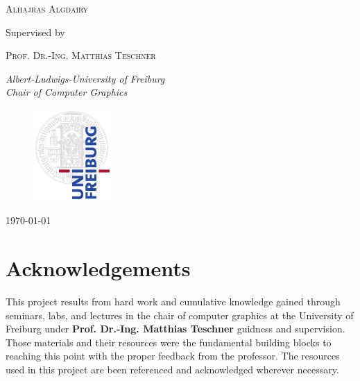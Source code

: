 \documentclass[11pt,a4paper]{article}
\begin{document}
\begin{titlepage}
	{\scshape\Large Alhajras Algdairy \\} %
	
			\vspace{0.5\baselineskip} %

	Supervised by
	
	\vspace{0.5\baselineskip} %
	
	{\scshape\Large Prof. Dr.-Ing. Matthias Teschner\\} %

	\vspace{0.5\baselineskip} %
		
	\textit{Albert-Ludwigs-University of Freiburg \\ Chair of Computer Graphics} %
	
		
\begin{figure}[h]	
     \centering
         \includegraphics[width=3cm]{images/freiburg.png}
\end{figure}
	\vfill %
	
	


	
	\vspace{0.3\baselineskip} %
	
	\today%
	

\end{titlepage}

\clearpage

\section*{Acknowledgements}
This project results from hard work and cumulative knowledge gained through seminars, labs, and lectures in the chair of computer graphics at the University of Freiburg under \textbf{Prof. Dr.-Ing. Matthias Teschner} guidness and supervision. Those materials and their resources were the fundamental building blocks to reaching this point with the proper feedback from the professor. The resources used in this project are been referenced and acknowledged wherever necessary.
\\
\end{document}
